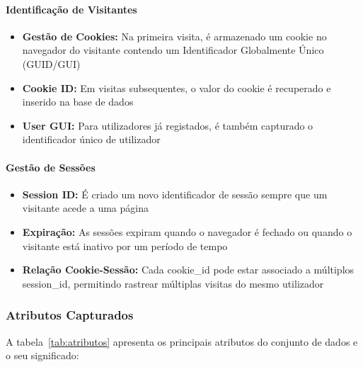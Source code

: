 \documentclass[11pt,a4paper]{article}
\begin{document}
\paragraph{Identificação de Visitantes}

\begin{itemize}
    \item \textbf{Gestão de Cookies:} Na primeira visita, é armazenado um cookie no navegador do visitante contendo um Identificador Globalmente Único (GUID/GUI)
    \item \textbf{Cookie ID:} Em visitas subsequentes, o valor do cookie é recuperado e inserido na base de dados
    \item \textbf{User GUI:} Para utilizadores já registados, é também capturado o identificador único de utilizador
\end{itemize}

\paragraph{Gestão de Sessões}

\begin{itemize}
    \item \textbf{Session ID:} É criado um novo identificador de sessão sempre que um visitante acede a uma página
    \item \textbf{Expiração:} As sessões expiram quando o navegador é fechado ou quando o visitante está inativo por um período de tempo
    \item \textbf{Relação Cookie-Sessão:} Cada cookie\_id pode estar associado a múltiplos session\_id, permitindo rastrear múltiplas visitas do mesmo utilizador
\end{itemize}

\subsubsection{Atributos Capturados}

A tabela~\ref{tab:atributos} apresenta os principais atributos do conjunto de dados e o seu significado:
\end{document}
